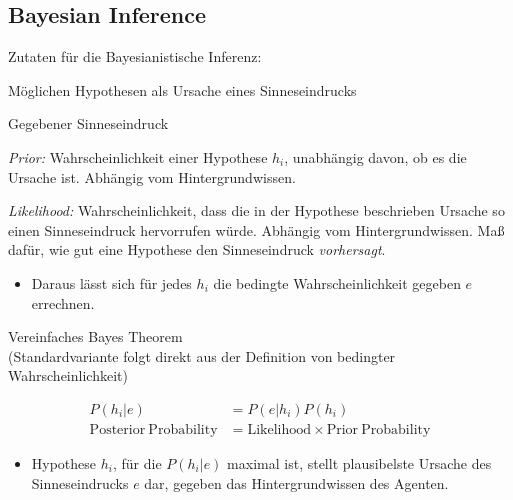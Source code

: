 \documentclass[11pt, handout]{beamer}
\begin{document}
\subsection{Bayesian Inference}

\begin{frame} 
  Zutaten für die Bayesianistische Inferenz:

  \begin{description}[xxxxxxxxx]
  \item[$h_1,...,h_n$] Möglichen Hypothesen als Ursache eines
    Sinneseindrucks
  \item[$e$] Gegebener Sinneseindruck
  \item[$P(h_i)$] \emph{Prior:} Wahrscheinlichkeit einer Hypothese
    $h_i$, unabhängig davon, ob es die Ursache ist. Abhängig vom
    Hintergrundwissen.
  \item[$P(e|h_i)$] \emph{Likelihood:} Wahrscheinlichkeit, dass die in
    der Hypothese beschrieben Ursache so einen Sinneseindruck
    hervorrufen würde. Abhängig vom Hintergrundwissen. Maß dafür, wie
    gut eine Hypothese den Sinneseindruck \emph{vorhersagt}.
  \end{description}

  \begin{itemize}[<+->]
  \item Daraus lässt sich für jedes $h_i$ die bedingte
    Wahrscheinlichkeit gegeben $e$ errechnen.
  \end{itemize}

\end{frame}

\begin{frame}

  Vereinfaches Bayes Theorem \\{\scriptsize (Standardvariante folgt
    direkt aus der Definition von bedingter Wahrscheinlichkeit)}

  \begin{align*}
    P(h_i|e) &= P(e|h_i)P(h_i) \\
    \mathrm{Posterior \: Probability} &= \mathrm{Likelihood} \times  \mathrm{Prior \: Probability}
  \end{align*}

  \begin{itemize}[<+->]
  \item Hypothese $h_i$, für die $P(h_i|e)$ maximal ist, stellt
    plausibelste Ursache des Sinneseindrucks $e$ dar, gegeben das
    Hintergrundwissen des Agenten.
  \end{itemize}

\end{frame}
\end{document}
